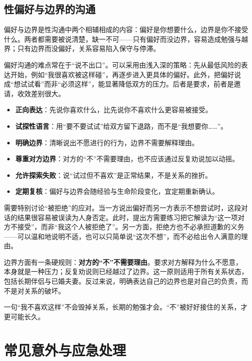 \documentclass[12pt,UTF8]{ctexbook}
\newcommand{\keyword}[1]{\textbf{#1}}
\begin{document}
\section{性偏好与边界的沟通}

偏好与边界是性沟通中两个相辅相成的内容：偏好是你想要什么，边界是你不接受什么。两者都需要被说清楚，缺一不可——只有偏好而没边界，容易造成勉强与越界；只有边界而没偏好，关系容易陷入保守与停滞。

偏好沟通的难点常在于“说不出口”。可以采用由浅入深的策略：先从最低风险的表达开始，例如“我很喜欢被这样碰”，再逐步进入更具体的偏好。此外，把偏好说成“想试试看”而非“必须这样”，能显著降低双方的压力。后者是要求，前者是邀请，收效差别很大。

\begin{itemize}
  \item \keyword{正向表达}：先说你喜欢什么，比先说你不喜欢什么更容易被接受。
  \item \keyword{试探性语言}：用“要不要试试”给双方留下退路，而不是“我想要你……”。
  \item \keyword{明确边界}：清晰说出不愿进行的行为，边界不需要解释理由。
  \item \keyword{尊重对方边界}：对方的“不”不需要理由，也不应该通过反复劝说加以动摇。
  \item \keyword{允许探索失败}：说“试过但不喜欢”是正常结果，不是关系的挫折。
  \item \keyword{定期复核}：偏好与边界会随经验与生命阶段变化，宜定期重新确认。
\end{itemize}

需要特别讨论“被拒绝”的应对。当一方说出偏好而另一方表示不想尝试时，这段对话的结果很容易被误读为人身否定。此时，提出方需要练习把它解读为“这一项对方不接受”，而非“我这个人被拒绝了”。另一方面，拒绝方也不必承担道歉的义务——可以温和地说明不适，也可以只简单说“这次不想”，而不必给出令人满意的理由。

边界方面有一条硬规则：\keyword{对方的“不”不需要理由}。要求对方解释为什么不愿意，本身就是一种压力；反复劝说则已经越过了边界。这一原则适用于所有关系状态，包括长期伴侣与已婚夫妻。反过来说，明确表达自己的边界也是对自己的负责，而不是对关系的破坏。

\begin{tcolorbox}[colback=pink!5!white,colframe=red!50!black,title=贴心小叮咛]
一句“我不喜欢这样”不会毁掉关系，长期的勉强才会。“不”被好好接住的关系，才更可能长久。
\end{tcolorbox}

\chapter{常见意外与应急处理}
\end{document}
